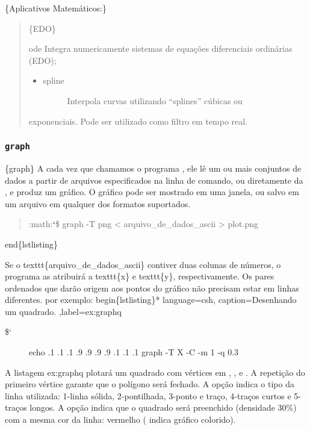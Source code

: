 \documentclass[a4paper,10pt,brazil]{sphinxmanual}
\begin{document}
\{Aplicativos Matemáticos:\}
\begin{quote}

\{EDO\}

ode
Integra numericamente sistemas de equações diferenciais ordinárias
(EDO);
\begin{itemize}
\item {} \begin{description}
\item[{spline}] \leavevmode
Interpola curvas utilizando ``splines'' cúbicas ou

\end{description}

\end{itemize}

exponenciais. Pode ser utilizado como filtro em tempo real.
\end{quote}


\subsubsection{\texttt{graph}}
\label{bash:graph}
\{graph\} A cada vez que chamamos o programa , ele lê um ou
mais conjuntos de dados a partir de arquivos especificados na linha
de comando, ou diretamente da , e produz um gráfico. O
gráfico pode ser mostrado em uma janela, ou salvo em um arquivo em
qualquer dos formatos suportados.
\begin{quote}

:math:{\color{red}\bfseries{}{}`}\$ graph -T png \textless{} arquivo\_de\_dados\_ascii \textgreater{} plot.png
\end{quote}

end\{lstlisting\}

Se o texttt\{arquivo\_de\_dados\_ascii\} contiver duas colunas de números, o programa as atribuirá a texttt\{x\} e texttt\{y\}, respectivamente. Os pares ordenados que darão origem aos pontos do gráfico não precisam estar em linhas diferentes. por exemplo:
begin\{lstlisting\}* language=csh, caption=Desenhando um quadrado. ,label=ex:graphq
\begin{description}
\item[{\${}`}] \leavevmode
echo .1 .1 .1 .9 .9 .9 .9 .1 .1 .1 graph -T X -C -m 1 -q 0.3

\end{description}

A listagem ex:graphq plotará um quadrado com vértices em
, ,  e . A
repetição do primeiro vértice garante que o polígono será fechado.
A opção  indica o tipo da linha utilizada: 1-linha sólida,
2-pontilhada, 3-ponto e traço, 4-traços curtos e 5-traços longos. A
opção  indica que o quadrado será preenchido (densidade 30\%)
com a mesma cor da linha: vermelho ( indica gráfico
colorido).
\end{document}
